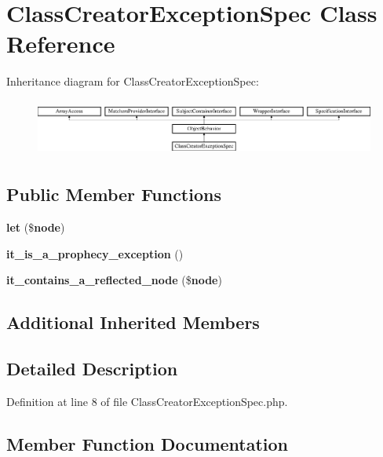 \section{Class\+Creator\+Exception\+Spec Class Reference}
\label{classspec_1_1_prophecy_1_1_exception_1_1_doubler_1_1_class_creator_exception_spec}
Inheritance diagram for Class\+Creator\+Exception\+Spec\+:\begin{figure}[H]
\begin{center}
\leavevmode
\includegraphics[height=1.887640cm]{classspec_1_1_prophecy_1_1_exception_1_1_doubler_1_1_class_creator_exception_spec}
\end{center}
\end{figure}
\subsection*{Public Member Functions}
\begin{DoxyCompactItemize}
\item 
{\bf let} (\${\bf node})
\item 
{\bf it\+\_\+is\+\_\+a\+\_\+prophecy\+\_\+exception} ()
\item 
{\bf it\+\_\+contains\+\_\+a\+\_\+reflected\+\_\+node} (\${\bf node})
\end{DoxyCompactItemize}
\subsection*{Additional Inherited Members}


\subsection{Detailed Description}


Definition at line 8 of file Class\+Creator\+Exception\+Spec.\+php.



\subsection{Member Function Documentation}
